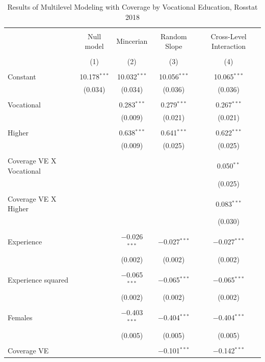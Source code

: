 \documentclass[12pt,a4paper]{article}
\numberwithin{equation}{section}
\begin{document}
\begin{table}[!htbp] \centering 
	\caption{Results of Multilevel Modeling with Coverage by Vocational Education, Rosstat 2018} 
	\label{} 
	\begin{tabular}{@{\extracolsep{5pt}}lcccc} 
		\\[-1.8ex]\hline 
		\hline \\[-1.8ex] 
		& Null model & Mincerian & Random Slope & Cross-Level Interaction \\ 
		\\[-1.8ex] & (1) & (2) & (3) & (4)\\ 
		\hline \\[-1.8ex] 
		Constant & 10.178$^{***}$ & 10.032$^{***}$ & 10.056$^{***}$ & 10.065$^{***}$ \\ 
		& (0.034) & (0.034) & (0.036) & (0.036) \\ 
		& & & & \\ 
		Vocational &  & 0.283$^{***}$ & 0.279$^{***}$ & 0.267$^{***}$ \\ 
		&  & (0.009) & (0.021) & (0.021) \\ 
		& & & & \\ 
		Higher &  & 0.638$^{***}$ & 0.641$^{***}$ & 0.622$^{***}$ \\ 
		&  & (0.009) & (0.025) & (0.025) \\ 
		& & & & \\ 
		Coverage VE X Vocational &  &  &  & 0.050$^{**}$ \\ 
		&  &  &  & (0.025) \\ 
		& & & & \\ 
		Coverage VE X Higher &  &  &  & 0.083$^{***}$ \\ 
		&  &  &  & (0.030) \\ 
		& & & & \\ 
		Experience &  & $-$0.026$^{***}$ & $-$0.027$^{***}$ & $-$0.027$^{***}$ \\ 
		&  & (0.002) & (0.002) & (0.002) \\ 
		& & & & \\ 
		Experience squared &  & $-$0.065$^{***}$ & $-$0.065$^{***}$ & $-$0.065$^{***}$ \\ 
		&  & (0.002) & (0.002) & (0.002) \\ 
		& & & & \\ 
		Females &  & $-$0.403$^{***}$ & $-$0.404$^{***}$ & $-$0.404$^{***}$ \\ 
		&  & (0.005) & (0.005) & (0.005) \\ 
		& & & & \\ 
		Coverage VE &  &  & $-$0.101$^{***}$ & $-$0.142$^{***}$ \\ 

\end{tabular}
\end{table}
\end{document}
